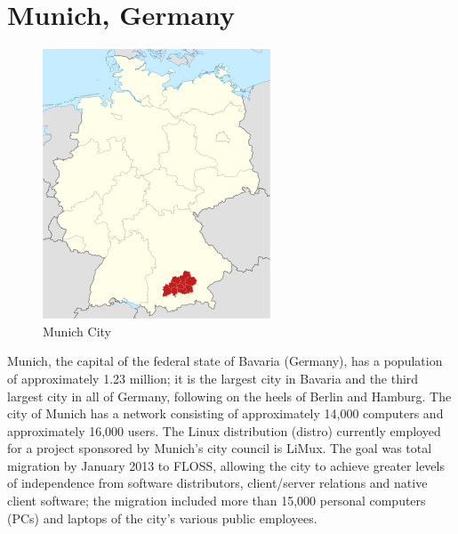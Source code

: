 \section {Munich, Germany  }
\begin{figure}[H]
\centering
    \includegraphics[scale=0.8]{img/munich.png} 
  \caption{Munich City}
  \label{Munich}
    \end{figure}

Munich, the capital of the federal state of Bavaria (Germany), has a population of approximately 1.23 million; it is the largest city in Bavaria and the third largest city in all of Germany, following on the heels of Berlin and Hamburg. The city of Munich has a network consisting of approximately 14,000 computers and approximately 16,000 users. The Linux distribution (distro) currently employed for a project sponsored by Munich’s city council is LiMux. The goal was total migration by January 2013 to FLOSS, allowing the city to achieve greater levels of independence from software distributors, client/server relations and native client software; the migration included more than 15,000 personal computers (PCs) and laptops of the city’s various public employees.

